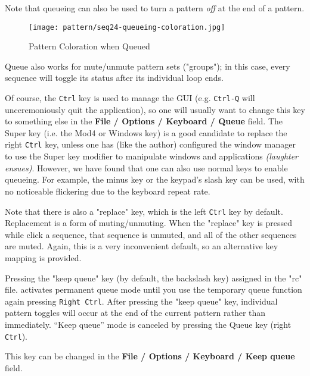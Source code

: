    Note that queueing can also be used to turn a pattern \textsl{off}
   at the end of a pattern.

\begin{figure}[H]
   \centering 
   \texttt{[image: pattern/seq24-queueing-coloration.jpg]}
   \caption{Pattern Coloration when Queued}
   \label{fig:seq64_queueing_coloration}
\end{figure}

   Queue also works for mute/unmute pattern sets ("groups"); in this case,
   every sequence will toggle its status after its individual loop ends. 

   Of course, the \texttt{Ctrl} key is used to manage the GUI (e.g.
   \texttt{Ctrl-Q} will unceremoniously quit the application), so one will
   usually want to change this key to something else in the
   \textbf{File / Options / Keyboard / Queue} field.
   The Super key (i.e. the Mod4 or Windows key) is a good candidate to
   replace the right \texttt{Ctrl} key, unless one has (like the author)
   configured the window manager to use the Super key modifier to manipulate
   windows and applications \textsl{(laughter ensues)}.
   However, we have found that one can also use normal keys to enable queueing.
   For example, the minus key or the keypad's slash key can be used, with no
   noticeable flickering due to the keyboard repeat rate.

   Note that there is also a "replace" key, which is the left \texttt{Ctrl} key
   by default.  Replacement is a form of muting/unmuting.  When the "replace"
   key is pressed while click a sequence, that sequence is unmuted, and all
   of the other sequences are muted.  Again, this is a very inconvenient
   default, so an alternative key mapping is provided.

   Pressing the "keep queue" key (by default, the backslash key)
   assigned in the "rc" file.
   activates permanent queue mode until you use the temporary 
   queue function again pressing \texttt{Right Ctrl}. 
   After pressing the "keep queue" key, individual pattern
   toggles will occur at the end of the current pattern rather than immediately.
   “Keep queue” mode is canceled by pressing the Queue key (right \texttt{Ctrl}).

   This key can be changed in the
   \textbf{File / Options / Keyboard / Keep queue} field.

